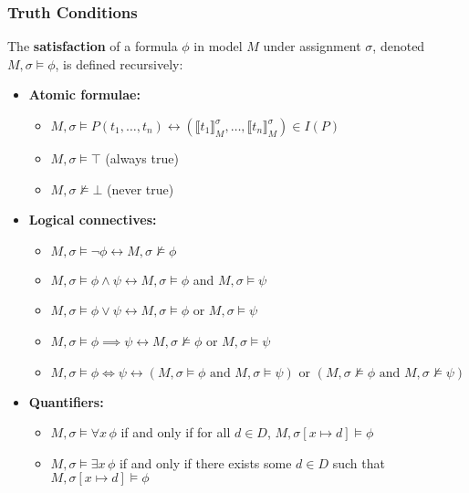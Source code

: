\subsubsection{Truth Conditions}
The \textbf{satisfaction} of a formula \(\phi\) in model \(M\) under assignment \(\sigma\), denoted \(M, \sigma \models \phi\), is defined recursively:

\begin{itemize}
  \item \textbf{Atomic formulae:}
  \begin{itemize}
    \item \(M, \sigma \models P(t_1, \ldots, t_n) \leftrightarrow (\llbracket t_1 \rrbracket_M^\sigma, \ldots, \llbracket t_n \rrbracket_M^\sigma) \in I(P)\)
    \item \(M, \sigma \models \top\) (always true)
    \item \(M, \sigma \not\models \bot\) (never true)
  \end{itemize}
  
  \item \textbf{Logical connectives:}
  \begin{itemize}
    \item \(M, \sigma \models \neg \phi \leftrightarrow M, \sigma \not\models \phi\)
    \item \(M, \sigma \models \phi \land \psi \leftrightarrow M, \sigma \models \phi\) and \(M, \sigma \models \psi\)
    \item \(M, \sigma \models \phi \lor \psi \leftrightarrow M, \sigma \models \phi\) or \(M, \sigma \models \psi\)
    \item \(M, \sigma \models \phi \implies \psi \leftrightarrow M, \sigma \not\models \phi\) or \(M, \sigma \models \psi\)
    \item \(M, \sigma \models \phi \iff \psi \leftrightarrow \left(M, \sigma \models \phi \text{ and } M, \sigma \models \psi\right) \text{ or } \left(M, \sigma \not\models \phi \text{ and } M, \sigma \not\models \psi\right)\)
  \end{itemize}
  
  \item \textbf{Quantifiers:}
  \begin{itemize}
    \item \(M, \sigma \models \forall x \, \phi\) if and only if for all \(d \in D\), \(M, \sigma[x \mapsto d] \models \phi\)
    \item \(M, \sigma \models \exists x \, \phi\) if and only if there exists some \(d \in D\) such that \(M, \sigma[x \mapsto d] \models \phi\)
  \end{itemize}
\end{itemize}

